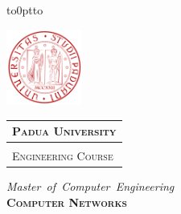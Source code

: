 \documentclass[a4paper, 8pt, twoside, openright]{book}
\begin{document}
\frontmatter

\begin{titlepage} %
\begin{center}
\vbox to0pt{\vbox to\vss}

\begin{center}
\begin{minipage}{.20\textwidth}
  \includegraphics[height=2.5cm]{./Images/Icon4}
\end{minipage}\begin{minipage}{.55\textwidth}
  \begin{table}[H]
  \begin{tabular}{l}
  \scshape{\Large{\bfseries{Padua University}}} \\
  \hline \\
  \scshape{\Large{Engineering Course}} \\
  \end{tabular}
  \end{table}
\end{minipage}
\end{center}


\vspace{1cm}
\emph{\Large{Master~of~Computer~Engineering}} \\
\vspace{0.9cm}
\scshape{\Large{\bfseries{Computer Networks}}} \\
\vspace{0.2cm} \linespread{1} \scshape{\large{\bfseries{}}}
\end{center}


\end{titlepage}
\end{document}
